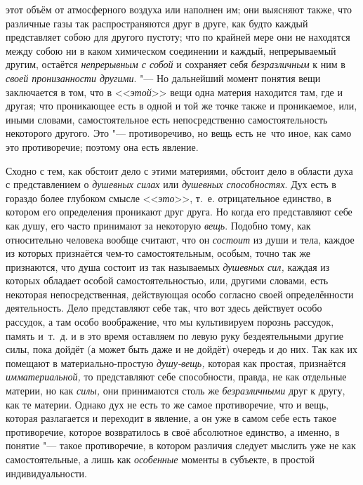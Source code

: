 этот объём от атмосферного воздуха или наполнен им; они выясняют также, что
различные газы так распространяются друг в друге, как будто каждый
представляет собою для другого пустоту; что по крайней мере они не
находятся между собою ни в каком химическом соединении и каждый,
непрерываемый другим, остаётся {\em непрерывным с
собой} и сохраняет себя {\em безразличным} к ним в
{\em своей пронизанности другими}. "--- Но дальнейший
момент понятия вещи заключается в том, что в
<<{\em этой}>> вещи одна материя находится там, где и
другая; что проникающее есть в одной и той же точке также и проникаемое,
или, иными словами, самостоятельное есть непосредственно самостоятельность
некоторого другого. Это "--- противоречиво, но вещь есть не~что иное, как само
это противоречие; поэтому она есть явление.

Сходно с тем, как обстоит дело с этими материями, обстоит дело в области
духа с представлением о {\em душевных силах} или
{\em душевных способностях}. Дух есть в гораздо более
глубоком смысле <<{\em это}>>, т.~е. отрицательное
единство, в котором его определения проникают друг друга. Но когда его
представляют себе как душу, его часто принимают за некоторую
{\em вещь}. Подобно тому, как относительно человека
вообще считают, что он {\em состоит} из души и тела,
каждое из которых признаётся чем-то самостоятельным, особым, точно так же
признаются, что душа состоит из так называемых
{\em душевных сил,} каждая из которых обладает особой
самостоятельностью, или, другими словами, есть некоторая непосредственная,
действующая особо согласно своей определённости деятельность. Дело
представляют себе так, что вот здесь действует особо рассудок, а там особо
воображение, что мы культивируем порознь рассудок, память и~т.~д. и в это
время оставляем по левую руку бездеятельными другие силы, пока дойдёт (а
может быть даже и не дойдёт) очередь и до них. Так как их помещают в
материально-простую {\em душу-вещь,} которая как
простая, признаётся {\em имматериальной,} то
представляют себе способности, правда, не как отдельные материи, но как
{\em силы,} они принимаются столь же
{\em безразличными} друг к другу, как те материи.
Однако дух не есть то же самое противоречие, что и вещь, которая
разлагается и переходит в явление, а он уже в самом себе есть такое
противоречие, которое возвратилось в своё абсолютное единство, а именно, в
понятие "--- такое противоречие, в котором различия следует мыслить уже не как
самостоятельные, а лишь как {\em особенные} моменты в
субъекте, в простой индивидуальности.
